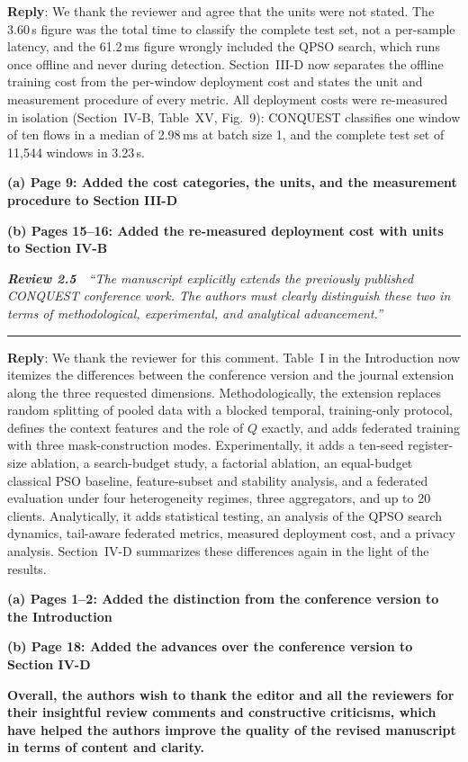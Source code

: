 \documentclass[11pt]{article}
\newcommand{\review}[2]{\par\bigskip\noindent\textbf{\textit{Review #1}}\ \ \textit{``#2''}\par\smallskip\hrule\medskip}
\newcommand{\reply}{\noindent\textbf{Reply}: }
\newcommand{\loc}[1]{\par\medskip\noindent\textbf{#1}\par}
\begin{document}
\reply We thank the reviewer and agree that the units were not stated. The
3.60\,s figure was the total time to classify the complete test set, not a
per-sample latency, and the 61.2\,ms figure wrongly included the QPSO search,
which runs once offline and never during detection. Section~III-D now
separates the offline training cost from the per-window deployment cost and
states the unit and measurement procedure of every metric. All deployment
costs were re-measured in isolation (Section~IV-B, Table~XV, Fig.~9):
CONQUEST classifies one window of ten flows in a median of 2.98\,ms at batch
size 1, and the complete test set of 11{,}544 windows in 3.23\,s.

\loc{(a) Page 9: Added the cost categories, the units, and the measurement procedure to Section III-D}

\loc{(b) Pages 15--16: Added the re-measured deployment cost with units to Section IV-B}

\review{2.5}{The manuscript explicitly extends the previously published CONQUEST conference work. The authors must clearly distinguish these two in terms of methodological, experimental, and analytical advancement.}

\reply We thank the reviewer for this comment. Table~I in the Introduction
now itemizes the differences between the conference version and the journal
extension along the three requested dimensions. Methodologically, the
extension replaces random splitting of pooled data with a blocked temporal,
training-only protocol, defines the context features and the role of $Q$
exactly, and adds federated training with three mask-construction modes.
Experimentally, it adds a ten-seed register-size ablation, a search-budget
study, a factorial ablation, an equal-budget classical PSO baseline,
feature-subset and stability analysis, and a federated evaluation under four
heterogeneity regimes, three aggregators, and up to 20 clients. Analytically,
it adds statistical testing, an analysis of the QPSO search dynamics,
tail-aware federated metrics, measured deployment cost, and a privacy
analysis. Section~IV-D summarizes these differences again in the light of the
results.

\loc{(a) Pages 1--2: Added the distinction from the conference version to the Introduction}

\loc{(b) Page 18: Added the advances over the conference version to Section IV-D}

\bigskip
\noindent\textbf{Overall, the authors wish to thank the editor and all the
reviewers for their insightful review comments and constructive criticisms,
which have helped the authors improve the quality of the revised manuscript
in terms of content and clarity.}
\end{document}
